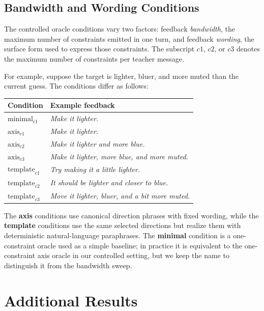 \documentclass[11pt]{article}
\begin{document}
\subsection{Bandwidth and Wording Conditions}
\label{app:bandwidth_wording_examples}

The controlled oracle conditions vary two factors: feedback
\emph{bandwidth}, the maximum number of constraints emitted in one turn, and
feedback \emph{wording}, the surface form used to express those constraints.
The subscript $c1$, $c2$, or $c3$ denotes the maximum number of constraints
per teacher message.

For example, suppose the target is lighter, bluer, and more muted than the
current guess. The conditions differ as follows:

\begin{center}
\small
\begin{tabular}{@{}ll@{}}
\toprule
Condition & Example feedback \\
\midrule
$\text{minimal}_{c1}$ &
\textit{Make it lighter.} \\
$\text{axis}_{c1}$ &
\textit{Make it lighter.} \\
$\text{axis}_{c2}$ &
\textit{Make it lighter and more blue.} \\
$\text{axis}_{c3}$ &
\textit{Make it lighter, more blue, and more muted.} \\
$\text{template}_{c1}$ &
\textit{Try making it a little lighter.} \\
$\text{template}_{c2}$ &
\textit{It should be lighter and closer to blue.} \\
$\text{template}_{c3}$ &
\textit{Move it lighter, bluer, and a bit more muted.} \\
\bottomrule
\end{tabular}
\end{center}

The \textbf{axis} conditions use canonical direction phrases with fixed
wording, while the \textbf{template} conditions use the same selected
directions but realize them with deterministic natural-language paraphrases.
The \textbf{minimal} condition is a one-constraint oracle used as a simple
baseline; in practice it is equivalent to the one-constraint axis oracle in
our controlled setting, but we keep the name to distinguish it from the
bandwidth sweep.






\section{Additional Results}
\label{sec:appendix-results}
\end{document}

